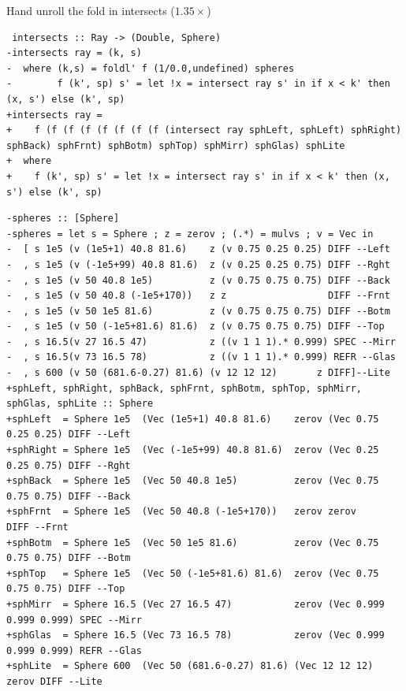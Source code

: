 \documentclass[8pt]{beamer}
\begin{document}
\begin{frame}[fragile]{Hand unroll the fold in intersects ($1.35\times$)}

\begin{verbatim}
 intersects :: Ray -> (Double, Sphere)
-intersects ray = (k, s)
-  where (k,s) = foldl' f (1/0.0,undefined) spheres
-        f (k', sp) s' = let !x = intersect ray s' in if x < k' then (x, s') else (k', sp)
+intersects ray =
+    f (f (f (f (f (f (f (f (intersect ray sphLeft, sphLeft) sphRight) sphBack) sphFrnt) sphBotm) sphTop) sphMirr) sphGlas) sphLite
+  where
+    f (k', sp) s' = let !x = intersect ray s' in if x < k' then (x, s') else (k', sp)
\end{verbatim}


\begin{verbatim}
-spheres :: [Sphere]
-spheres = let s = Sphere ; z = zerov ; (.*) = mulvs ; v = Vec in
-  [ s 1e5 (v (1e5+1) 40.8 81.6)    z (v 0.75 0.25 0.25) DIFF --Left
-  , s 1e5 (v (-1e5+99) 40.8 81.6)  z (v 0.25 0.25 0.75) DIFF --Rght
-  , s 1e5 (v 50 40.8 1e5)          z (v 0.75 0.75 0.75) DIFF --Back
-  , s 1e5 (v 50 40.8 (-1e5+170))   z z                  DIFF --Frnt
-  , s 1e5 (v 50 1e5 81.6)          z (v 0.75 0.75 0.75) DIFF --Botm
-  , s 1e5 (v 50 (-1e5+81.6) 81.6)  z (v 0.75 0.75 0.75) DIFF --Top
-  , s 16.5(v 27 16.5 47)           z ((v 1 1 1).* 0.999) SPEC --Mirr
-  , s 16.5(v 73 16.5 78)           z ((v 1 1 1).* 0.999) REFR --Glas
-  , s 600 (v 50 (681.6-0.27) 81.6) (v 12 12 12)       z DIFF]--Lite
+sphLeft, sphRight, sphBack, sphFrnt, sphBotm, sphTop, sphMirr, sphGlas, sphLite :: Sphere
+sphLeft  = Sphere 1e5  (Vec (1e5+1) 40.8 81.6)    zerov (Vec 0.75 0.25 0.25) DIFF --Left
+sphRight = Sphere 1e5  (Vec (-1e5+99) 40.8 81.6)  zerov (Vec 0.25 0.25 0.75) DIFF --Rght
+sphBack  = Sphere 1e5  (Vec 50 40.8 1e5)          zerov (Vec 0.75 0.75 0.75) DIFF --Back
+sphFrnt  = Sphere 1e5  (Vec 50 40.8 (-1e5+170))   zerov zerov              DIFF --Frnt
+sphBotm  = Sphere 1e5  (Vec 50 1e5 81.6)          zerov (Vec 0.75 0.75 0.75) DIFF --Botm
+sphTop   = Sphere 1e5  (Vec 50 (-1e5+81.6) 81.6)  zerov (Vec 0.75 0.75 0.75) DIFF --Top
+sphMirr  = Sphere 16.5 (Vec 27 16.5 47)           zerov (Vec 0.999 0.999 0.999) SPEC --Mirr
+sphGlas  = Sphere 16.5 (Vec 73 16.5 78)           zerov (Vec 0.999 0.999 0.999) REFR --Glas
+sphLite  = Sphere 600  (Vec 50 (681.6-0.27) 81.6) (Vec 12 12 12)       zerov DIFF --Lite
\end{verbatim}

\end{frame}
\end{document}
